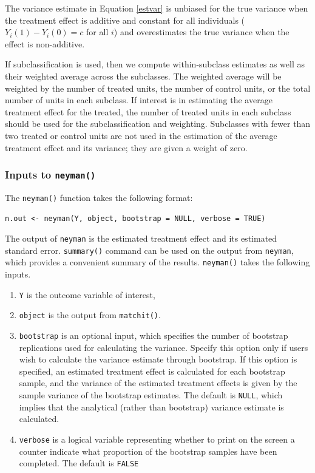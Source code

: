 \documentclass[oneside,letterpaper,titlepage]{article}
\begin{document}
The variance estimate in Equation \eqref{estvar} is unbiased for the
true variance when the treatment effect is additive and constant for
all individuals ($Y_i(1)-Y_i(0)=c$ for all $i$) and overestimates the
true variance when the effect is non-additive.

If subclassification is used, then we compute within-subclass
estimates as well as their weighted average across the subclasses.
The weighted average will be weighted by the number of treated units,
the number of control units, or the total number of units in each
subclass.  If interest is in estimating the average treatment effect
for the treated, the number of treated units in each subclass should
be used for the subclassification and weighting.  Subclasses with
fewer than two treated or control units are not used in the estimation
of the average treatment effect and its variance; they are given a
weight of zero.

\subsubsection{Inputs to {\tt neyman()}}

The {\tt neyman()} function takes the following format:
\begin{verbatim}
n.out <- neyman(Y, object, bootstrap = NULL, verbose = TRUE)
\end{verbatim}
The output of {\tt neyman} is the estimated treatment effect and its
estimated standard error.  {\tt summary()} command can be used on the
output from {\tt neyman}, which provides a convenient summary of the
results. {\tt neyman()} takes the following inputs.

\begin{enumerate}
\item {\tt Y} is the outcome variable of interest, 
\item {\tt object} is the output from {\tt matchit()}.
\item {\tt bootstrap} is an optional input, which specifies the number
  of bootstrap replications used for calculating the variance. Specify
  this option only if users wish to calculate the variance estimate
  through bootstrap. If this option is specified, an estimated
  treatment effect is calculated for each bootstrap sample, and the
  variance of the estimated treatment effects is given by the sample
  variance of the bootstrap estimates. The default is {\tt NULL},
  which implies that the analytical (rather than bootstrap) variance
  estimate is calculated.
\item {\tt verbose} is a logical variable representing whether to
  print on the screen a counter indicate what proportion of the
  bootstrap samples have been completed. The default is {\tt FALSE}
\end{enumerate}
\end{document}
